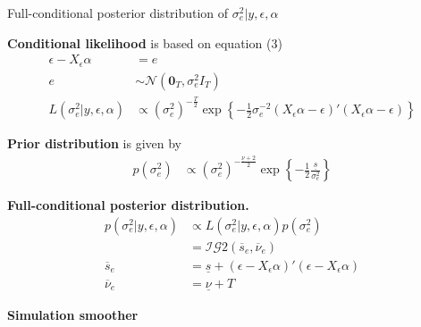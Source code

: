 \documentclass[notes,blackandwhite,mathsans,usenames,dvipsnames]{beamer}
\begin{document}
\begin{frame}{Full-conditional posterior distribution of $\sigma^2_e|y,\epsilon,\alpha$}

\small
\bigskip\textbf{Conditional likelihood} {\color{mcxs2}is based on equation} (3)
\begin{align*}
\epsilon-X_\epsilon \alpha &=e\\
e  &\sim\mathcal{N}\left(\mathbf{0}_T, \sigma^2_e I_T\right)\\
L\left(\sigma^2_e|y,\epsilon,\alpha\right)&\propto \left(\sigma^2_e\right)^{-\frac{T}{2}}\exp\left\{-\frac{1}{2}\sigma^{-2}_e\left(X_\epsilon \alpha-\epsilon\right)'\left(X_\epsilon \alpha-\epsilon\right)  \right\}
\end{align*}

\smallskip\textbf{Prior distribution} is given by
\begin{align*}
p\left(\sigma^2_e\right)&\propto\left(\sigma^2_e\right)^{-\frac{\underline{\nu}+2}{2}} \exp\left\{ -\frac{1}{2}\frac{\underline{s}}{\sigma^2_e} \right\}
\end{align*}

\smallskip\textbf{Full-conditional posterior distribution.}
\begin{align*}
p\left( \sigma^2_e|y,\epsilon,\alpha \right) &\propto L\left(\sigma^2_e|y,\epsilon,\alpha\right)p\left(\sigma^2_e\right)\\
&= \mathcal{IG}2\left(\overline{s}_e,\overline{\nu}_e\right)\\
\overline{s}_e &= \underline{s} + (\epsilon-X_\epsilon \alpha)'(\epsilon-X_\epsilon \alpha)\\
\overline{\nu}_e &= \underline{\nu} + T
\end{align*}

\end{frame}








{
\begin{frame}

\begin{adjustwidth}{-0.5cm}{0cm}
\vspace{8.3cm}\Large
\textbf{{\color{mcxs2}Simulation} {\color{mcxs1}smoother}}
\end{adjustwidth}

\end{frame}
}
\end{document}
